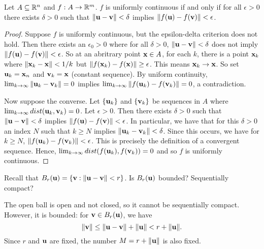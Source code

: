 \documentclass[letterpaper, twoside, 12pt]{book}
\begin{document}
\begin{theorem}[11.27, Exercise 11]
  Let \(A\subseteq\mathbb R^n\) and \(f:A\to\mathbb R^m\).
  \(f\) is uniformly continuous if and only if for all \(\epsilon>0\)
  there exists \(\delta>0\) such that \(\|\mathbf u-\mathbf v\|<\delta\)
  implies \(\|f(\mathbf u)-f(\mathbf v)\|<\epsilon\).
\end{theorem}

\begin{proof}
    Suppose \(f\) is uniformly continuous, but the epsilon-delta
    criterion does not hold. Then there exists an \(\epsilon_0 > 0\)
    where for all \(\delta > 0\), \(\|\mathbf u - \mathbf v\| < \delta\)
    does not imply \(\|f(\mathbf u) - f(\mathbf v)\| < \epsilon \). So
    at an abritrary point \(\mathbf x \in A\), for each \(k\), there is a point \(\mathbf x_k\)
    where \(\|\mathbf x_k - \mathbf x\| < 1/k\) but 
    \(\|f(\mathbf x_k) - f(\mathbf x)\| \geq \epsilon \). This means
    \(\mathbf x_k \to \mathbf x\). So set \(\mathbf u_k = \mathbf x_n\) and
    \(\mathbf v_k = \mathbf x\) (constant sequence). By uniform continuity,
    \(\lim_{k \to \infty} \|\mathbf u_k - \mathbf v_k \| = 0\) implies
    \(\lim_{k \to \infty} \|f(\mathbf u_k) - f(\mathbf v_k)\| = 0\), a
    contradiction.

    Now suppose the converse. Let \(\{\mathbf u_k\}\) and \(\{\mathbf v_k\}\)
    be sequences in \(A\) where \(\lim_{k \to \infty} dist(\mathbf u_k, \mathbf v_k) = 0\).
    Let \(\epsilon > 0\). Then there exists \(\delta > 0\) such that
    \(\|\mathbf u - \mathbf v\| < \delta \) implies
    \(\|f(\mathbf u) - f(\mathbf v)\| < \epsilon \). In particular, we 
    have that for this \(\delta > 0\) an index \(N\) such that 
    \(k \geq N\) implies \( \|\mathbf u_k - \mathbf v_k\| < \delta\). Since
    this occurs, we have for \(k \geq N\),
    \( \|f(\mathbf u_k) - f(\mathbf v_k)\| < \epsilon \). This is precisely
    the definition of a convergent sequence. Hence,
    \( \lim_{k \to \infty} dist(f(\mathbf u_k), f(\mathbf v_k)) = 0\)
    and so \(f\) is uniformly continuous.
\end{proof}

\begin{exercise}[3,4]
  Recall that \(B_r(\mathbf u)=\{\mathbf v:\|\mathbf u-\mathbf v\|<r\}\).
  Is \(B_r(\mathbf u)\) bounded? Sequentially compact?
\end{exercise}

\begin{solution}
    The open ball is open and not closed, so it cannot
    be sequentially compact. However, it is bounded: for 
    \(\mathbf v \in B_r(\mathbf u)\), we have
    \[ \|\mathbf v\| \leq \|\mathbf u - \mathbf v\| + \|\mathbf u\| < r + \|\mathbf u\| .\]
    Since \(r\) and \(\mathbf u\) are fixed, the number
    \(M = r + \|\mathbf u\|\) is also fixed.  
\end{solution}
\end{document}
